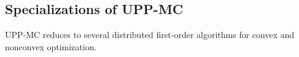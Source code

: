 \documentclass[12pt,draftcls,onecolumn]{IEEEtran}
\begin{document}
\subsection{Specializations of UPP-MC}
UPP-MC reduces to several distributed first-order algorithms for convex and nonconvex optimization.

\end{document}
